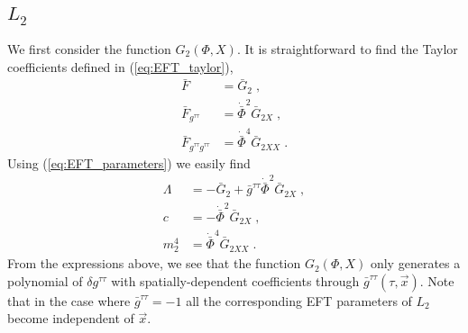 \documentclass[a4paper,11pt]{article}
\numberwithin{equation}{section}
\begin{document}
\subsection{$L_2$}
We first consider the function $G_2(\Phi,X)$. It is straightforward to find the Taylor coefficients defined in (\ref{eq:EFT_taylor}), 
\begin{align}
\bar{F} &= \bar{G}_2 \;, \\
\bar{F}_{g^{\tau\tau}} &= \dot{\bar{\Phi}}^2 \bar{G}_{2X}  \;, \\
\bar{F}_{g^{\tau\tau}g^{\tau\tau}} &= \dot{\bar{\Phi}}^4 \bar{G}_{2XX} \;. 
\end{align}
Using (\ref{eq:EFT_parameters}) we easily find
\begin{align}
\Lambda &= -\bar{G}_2 + \bar{g}^{\tau\tau} \dot{\bar{\Phi}}^2 \bar{G}_{2X} \;, \\
c &= - \dot{\bar{\Phi}}^2 \bar{G}_{2 X} \;, \\
m_2^4 &= \dot{\bar{\Phi}}^4 \bar{G}_{2XX} \;. 
\end{align}
From the expressions above, we see that the function $G_2(\Phi,X)$ only generates a polynomial of $\delta g^{\tau\tau}$ with spatially-dependent coefficients through $\bar{g}^{\tau\tau}(\tau,\vec{x})$. Note that in the case where $\bar{g}^{\tau\tau} = -1$ all the corresponding EFT parameters of $L_2$ become independent of $\vec{x}$. 
\end{document}

